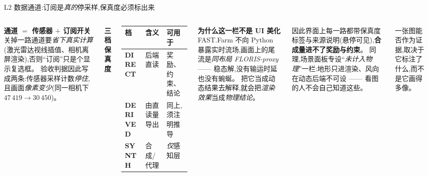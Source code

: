 \documentclass[aspectratio=169,11pt,UTF8]{ctexbeamer}
\newcommand{\emphb}[1]{\textcolor{myred}{\textbf{#1}}}
\begin{document}
\begin{frame}{L2 数据通道:订阅是\emph{真的}停采样,保真度必须标出来}
\small
\begin{columns}[T]
\textbf{通道 $=$ 传感器 $+$ 订阅开关}\\[1mm]
关掉一路通道要\emph{省下真实计算}(激光雷达视线插值、相机离屏渲染),否则“订阅”只是个显示复选框。
验收判据因此写成两条:传感器采样计数\emph{停住},且画面\emph{像素变少}(同一相机下 $47\,419\to30\,450$)。
\vspace{2mm}

\textbf{三档保真度}\\[1mm]
{\footnotesize
\begin{tabular}{@{}lll@{}}
\toprule
档 & 含义 & 可用于 \\
\midrule
\textcolor{mygreen}{\textbf{DIRECT}} & 后端直读 & 奖励、约束、结论 \\
\textcolor{myblue}{\textbf{DERIVED}} & 由直读量导出 & 同上,须注明推导 \\
\textcolor{myred}{\textbf{SYNTH}} & 合成/代理 & \emph{仅}感知层 \\
\bottomrule
\end{tabular}}
\textbf{为什么这一栏不是 UI 美化}\\[1mm]
FAST.Farm 不向 Python 暴露实时流场,画面上的尾流是\emph{同布局 FLORIS-proxy} —— 稳态解,没有输运时延也没有蜿蜒。
把它当成动态结果去解释,就会把\emph{渲染效果}当成\emph{物理结论}。
\vspace{1.5mm}

因此界面上每一路都带保真度标签与来源说明(悬停可见),\emphb{合成量进不了奖励与约束}。
同理,场景面板专设“\emph{未计入物理}”一栏:地形只进渲染、风向在动态后端不可设 —— 看图的人不会自己知道这些。
\vspace{1.5mm}

\centering\footnotesize\color{mygray}
一张图能否作为证据,取决于它标注了什么,而不是它画得多像。
\end{columns}
\end{frame}
\end{document}
